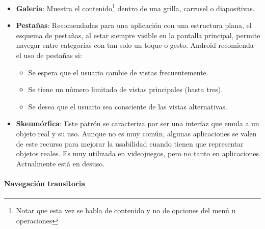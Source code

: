 \begin{itemize}
\item \textbf{Galería}: Muestra el contenido\footnote{Notar que esta vez se habla de contenido y no de opciones del menú u operaciones} dentro de una grilla, carrusel o diapositivas.

\item \textbf{Pestañas}: Recomendadas para una aplicación con una estructura plana, el esquema de pestañas, al estar siempre visible en la pantalla principal, permite navegar entre categorías con tan solo un toque o gesto. Android recomienda\cite{android2017appStructure} el uso de pestañas si: 
\begin{itemize}
\item Se espera que el usuario cambie de vistas frecuentemente.
\item Se tiene un número limitado de vistas principales (hasta tres).
\item Se desea que el usuario sea consciente de las vistas alternativas.
\end{itemize}

\item \textbf{Skeumórfica}: Este patrón se caracteriza por ser una interfaz que emula a un objeto real y su uso. Aunque no es muy común, algunas aplicaciones se valen de este recurso para mejorar la usabilidad cuando tienen que representar objetos reales. Es muy utilizada en videojuegos, pero no tanto en aplicaciones. Actualmente está en desuso\cite{gottling2017skeuomo}.


\end{itemize}

\paragraph{Navegación transitoria}
\label{navegacion_transitoria}

